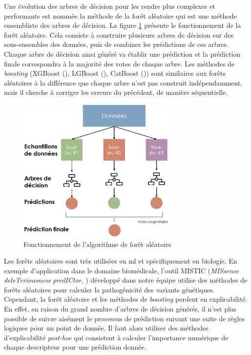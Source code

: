 Une évolution des arbres de décision pour les rendre plus complexes et performants est nommée la méthode de la forêt aléatoire qui est une méthode ensembliste des arbres de décision. La figure \ref{fig:random-forest} présente le fonctionnement de la forêt aléatoire. Cela consiste à construire plusieurs arbres de décision sur des sous-ensembles des données, puis de combiner les prédictions de ces arbres. Chaque arbre de décision ainsi généré va établir une prédiction et la prédiction finale correspondra à la majorité des votes de chaque arbre. Les méthodes de \textit{boosting} (XGBoost (\cite{chen_xgboost_2016}), LGBoost (\cite{ke_lightgbm_2017}), CatBoost (\cite{prokhorenkova_catboost_2019})) sont similaires aux forêts aléatoires à la différence que chaque arbre n'est pas construit indépendamment, mais il cherche à corriger les erreurs du précédent, de manière séquentielle.
\begin{figure}[!ht]
 \centering
 \includegraphics[width=0.7\textwidth]{figures/random_forest.png}
 \caption[Fonctionnement de l'algorithme de forêt aléatoire]{Fonctionnement de l'algorithme de forêt aléatoire}
 \label{fig:random-forest}
\end{figure}
Les forêts aléatoires sont très utilisées en \gls{ml} et spécifiquement en biologie. En exemple d'application dans le domaine biomédicale, l'outil MISTIC (\textit{MISsense deleTeriousness predICtor}, \cite{chennen_mistic_2020}) développé dans notre équipe utilise des méthodes de forêts aléatoires pour calculer la pathogénicité des variants génétiques. Cependant, la forêt aléatoire et les méthodes de \textit{boosting} perdent en explicabilité. En effet, en raison du grand nombre d'arbres de décision générés, il n'est plus possible de suivre aisément le processus de prédiction suivant une suite de règles logiques pour un point de donnée. Il faut alors utiliser des méthodes d'explicabilité \textit{post-hoc} qui consistent à calculer l'importance numérique de chaque descripteur pour une prédiction donnée.

